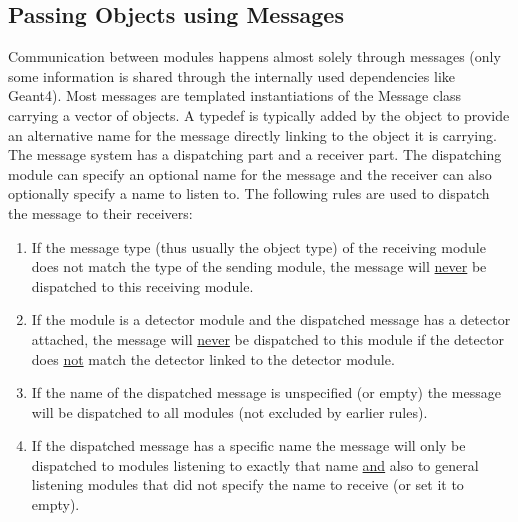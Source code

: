 \subsection{Passing Objects using Messages}
\label{sec:objects_messages}
Communication between modules happens almost solely through messages (only some information is shared through the internally used dependencies like Geant4). Most messages are templated instantiations of the Message class carrying a vector of objects. A typedef is typically added by the object to provide an alternative name for the message directly linking to the object it is carrying. The message system has a dispatching part and a receiver part. The dispatching module can specify an optional name for the message and the receiver can also optionally specify a name to listen to. The following rules are used to dispatch the message to their receivers:
\begin{enumerate}
\item If the message type (thus usually the object type) of the receiving module does not match the type of the sending module, the message will \underline{never} be dispatched to this receiving module.
\item If the module is a detector module and the dispatched message has a detector attached, the message will \underline{never} be dispatched to this module if the detector does \underline{not} match the detector linked to the detector module.
\item If the name of the dispatched message is unspecified (or empty) the message will be dispatched to all modules (not excluded by earlier rules).
\item If the dispatched message has a specific name the message will only be dispatched to modules listening to exactly that name \underline{and} also to general listening modules that did not specify the name to receive (or set it to empty).
\end{enumerate}

